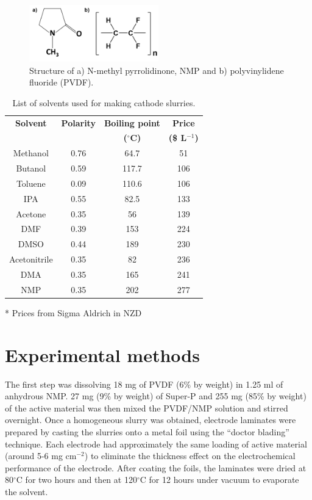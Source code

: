 \begin{figure}[tbh!]
\centering
\includegraphics[width=0.5\textwidth]{Figures/chap7fig/nmppvdf}
\caption{Structure of a) N-methyl pyrrolidinone, NMP and b) polyvinylidene fluoride (PVDF).}
\label{Figures/chap7fig:nmppvdf}
\end{figure}

\begin{table}
\centering
\caption{List of solvents used for making cathode slurries.} \label{tab1}
\begin{threeparttable}
\begin{tabular}{|c|c|c|c|} 
\hline
\textbf{Solvent} & \textbf{Polarity} & \textbf{Boiling point} & \textbf{Price}\\
\textbf{} & \textbf{} & \textbf{($^{\circ}$C)} & \textbf{(\$ L$^{-1}$)}\\
\hline
Methanol & 0.76 & 64.7 & 51 \\ 
Butanol & 0.59 & 117.7 & 106 \\
Toluene & 0.09 & 110.6 & 106 \\
IPA & 0.55 & 82.5 & 133 \\
Acetone & 0.35 & 56 & 139 \\
DMF & 0.39 & 153 & 224 \\
DMSO & 0.44 & 189 & 230 \\
Acetonitrile & 0.35 & 82 & 236 \\
DMA & 0.35 & 165 & 241 \\
NMP & 0.35 & 202 & 277 \\
 \hline
\end{tabular}
\begin{tablenotes}
\item[*] Prices from Sigma Aldrich in NZD
\end{tablenotes}
\end{threeparttable}
\end{table}

\section{Experimental methods}
The first step was dissolving 18 mg of PVDF (6\% by weight) in 1.25 ml of anhydrous NMP. 27 mg (9\% by weight) of Super-P and 255 mg (85\% by weight) of the active material was then mixed the PVDF/NMP solution and stirred overnight. Once a homogeneous slurry was obtained, electrode laminates were prepared by casting the slurries onto a metal foil using the \enquote{doctor blading} technique. Each electrode had approximately the same loading of active material (around 5-6 mg cm$^{-2}$) to eliminate the thickness effect on the electrochemical performance of the electrode. After coating the foils, the laminates were dried at 80$^{\circ}$C for two hours and then at 120$^{\circ}$C for 12 hours under vacuum to evaporate the solvent. 
